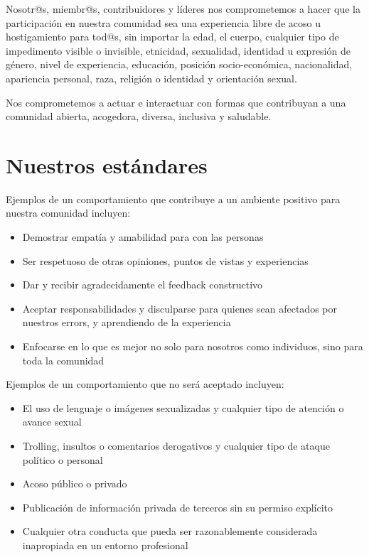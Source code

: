 \documentclass[
]{book}
\providecommand{\tightlist}{%
  \setlength{\itemsep}{0pt}\setlength{\parskip}{0pt}}
\begin{document}
Nosotr@s, miembr@s, contribuidores y líderes nos comprometemos a hacer que la participación en nuestra comunidad sea una experiencia libre de acoso u hostigamiento para tod@s, sin importar la edad, el cuerpo, cualquier tipo de impedimento visible o invisible, etnicidad, sexualidad, identidad u expresión de género, nivel de experiencia, educación, posición socio-económica, nacionalidad, apariencia personal, raza, religión o identidad y orientación sexual.

Nos comprometemos a actuar e interactuar con formas que contribuyan a una comunidad abierta, acogedora, diversa, inclusiva y saludable.

\hypertarget{nuestros-estuxe1ndares}{%
\section{Nuestros estándares}\label{nuestros-estuxe1ndares}}

Ejemplos de un comportamiento que contribuye a un ambiente positivo para nuestra comunidad incluyen:

\begin{itemize}
\tightlist
\item
  Demostrar empatía y amabilidad para con las personas
\item
  Ser respetuoso de otras opiniones, puntos de vistas y experiencias
\item
  Dar y recibir agradecidamente el feedback constructivo
\item
  Aceptar responsabilidades y disculparse para quienes sean afectados por nuestros errors, y aprendiendo de la experiencia
\item
  Enfocarse en lo que es mejor no solo para nosotros como individuos, sino para toda la comunidad
\end{itemize}

Ejemplos de un comportamiento que no será aceptado incluyen:

\begin{itemize}
\tightlist
\item
  El uso de lenguaje o imágenes sexualizadas y cualquier tipo de atención o avance sexual
\item
  Trolling, insultos o comentarios derogativos y cualquier tipo de ataque político o personal
\item
  Acoso público o privado
\item
  Publicación de información privada de terceros sin su permiso explícito
\item
  Cualquier otra conducta que pueda ser razonablemente considerada inapropiada en un entorno profesional
\end{itemize}
\end{document}
